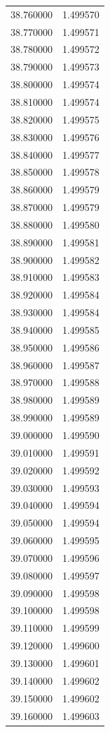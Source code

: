 \begin{tabular}{rr}
38.760000 & 1.499570 \\
38.770000 & 1.499571 \\
38.780000 & 1.499572 \\
38.790000 & 1.499573 \\
38.800000 & 1.499574 \\
38.810000 & 1.499574 \\
38.820000 & 1.499575 \\
38.830000 & 1.499576 \\
38.840000 & 1.499577 \\
38.850000 & 1.499578 \\
38.860000 & 1.499579 \\
38.870000 & 1.499579 \\
38.880000 & 1.499580 \\
38.890000 & 1.499581 \\
38.900000 & 1.499582 \\
38.910000 & 1.499583 \\
38.920000 & 1.499584 \\
38.930000 & 1.499584 \\
38.940000 & 1.499585 \\
38.950000 & 1.499586 \\
38.960000 & 1.499587 \\
38.970000 & 1.499588 \\
38.980000 & 1.499589 \\
38.990000 & 1.499589 \\
39.000000 & 1.499590 \\
39.010000 & 1.499591 \\
39.020000 & 1.499592 \\
39.030000 & 1.499593 \\
39.040000 & 1.499594 \\
39.050000 & 1.499594 \\
39.060000 & 1.499595 \\
39.070000 & 1.499596 \\
39.080000 & 1.499597 \\
39.090000 & 1.499598 \\
39.100000 & 1.499598 \\
39.110000 & 1.499599 \\
39.120000 & 1.499600 \\
39.130000 & 1.499601 \\
39.140000 & 1.499602 \\
39.150000 & 1.499602 \\
39.160000 & 1.499603 \\

\end{tabular}

